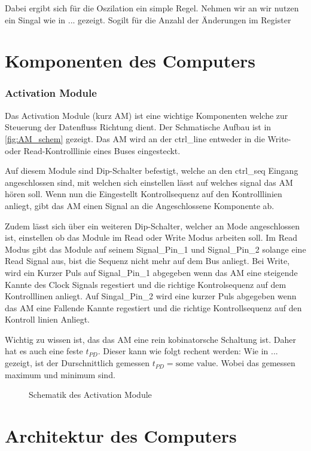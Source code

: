 \documentclass{scrartcl}
\begin{document}
    Dabei ergibt sich für die Oszilation ein simple Regel. Nehmen wir an wir nutzen ein Singal wie in ... gezeigt. Sogilt für die Anzahl der Änderungen im Register

    \section{Komponenten des Computers}

    \subsubsection{Activation Module}

    Das Activation Module (kurz AM) ist eine wichtige Komponenten welche zur Steuerung der Datenfluss Richtung dient. Der Schmatische Aufbau ist in \autoref{fig:AM_schem} gezeigt. Das AM wird an der ctrl\_line entweder in die Write- oder Read-Kontrolllinie eines Buses eingesteckt.
    
    Auf diesem Module sind Dip-Schalter befestigt, welche an den ctrl\_seq Eingang angeschlossen sind, mit welchen sich einstellen lässt auf welches signal das AM hören soll. Wenn nun die Eingestellt Kontrollsequenz auf den Kontrolllinien anliegt, gibt das AM einen Signal an die Angeschlossene Komponente ab. 
    
    Zudem lässt sich über ein weiteren Dip-Schalter, welcher an Mode angeschlossen ist, einstellen ob das Module im Read oder Write Modus arbeiten soll. Im Read Modus gibt das Module auf seinem Signal\_Pin\_1 und Signal\_Pin\_2 solange eine Read Signal aus, bist die Sequenz nicht mehr auf dem Bus anliegt. Bei Write, wird ein Kurzer Puls auf Signal\_Pin\_1 abgegeben wenn das AM eine steigende Kannte des Clock Signals regestiert und die richtige Kontrolsequenz auf dem Kontrolllinen anliegt. Auf Singal\_Pin\_2 wird eine kurzer Puls abgegeben wenn das AM eine Fallende Kannte regestiert und die richtige Kontrollsequenz auf den Kontroll linien Anliegt.

    Wichtig zu wissen ist, das das AM eine rein kobinatorsche Schaltung ist. Daher hat es auch eine feste $t_{PD}$. Dieser kann wie folgt rechent werden: Wie in ... gezeigt, ist der Durschnittlich gemessen $t_{PD} = \text{some value}$. Wobei das gemessen maximum und minimum sind.
    
    \begin{figure}
        \centering
        \resizebox{14cm}{!}{}
        \caption{Schematik des Activation Module\label{fig:AM_schem}}
    \end{figure}


    \section{Architektur des Computers}
\end{document}
